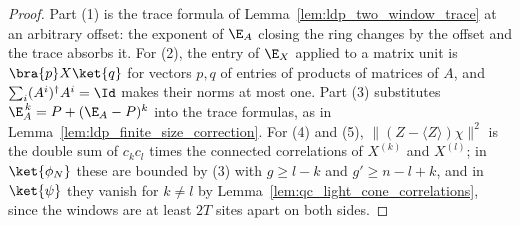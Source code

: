 \begin{proof}
    \leanok
    Part (1) is the trace formula of Lemma~\ref{lem:ldp_two_window_trace} at
    an arbitrary offset: the exponent of $\E_A$ closing the ring changes by
    the offset and the trace absorbs it. For (2), the entry of $\E_X$ applied
    to a matrix unit is $\bra{p}X\ket{q}$ for vectors $p,q$ of entries of
    products of matrices of $A$, and $\sum_i(A^i)^\dagger A^i=\Id$ makes their
    norms at most one. Part (3) substitutes $\E_A^{\,k}=P+(\E_A-P)^k$ into
    the trace formulas, as in Lemma~\ref{lem:ldp_finite_size_correction}. For
    (4) and (5), $\lVert(Z-\langle Z\rangle)\chi\rVert^2$ is the double sum
    of $c_kc_l$ times the connected correlations of $X^{(k)}$ and $X^{(l)}$;
    in $\ket{\phi_N}$ these are bounded by (3) with $g\ge l-k$ and
    $g'\ge n-l+k$, and in $\ket{\psi}$ they vanish for $k\ne l$ by
    Lemma~\ref{lem:qc_light_cone_correlations}, since the windows are at
    least $2T$ sites apart on both sides.
\end{proof}

